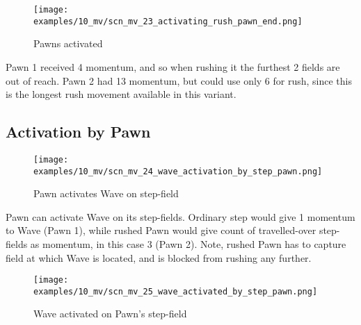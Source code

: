 \clearpage %

\noindent
\begin{figure}[!h]
\texttt{[image: examples/10\_mv/scn\_mv\_23\_activating\_rush\_pawn\_end.png]}
\caption{Pawns activated}
\label{fig:scn_mv_23_activating_rush_pawn_end}
\end{figure}

Pawn 1 received 4 momentum, and so when rushing it the furthest 2 fields are out
of reach. Pawn 2 had 13 momentum, but could use only 6 for rush, since this is the
longest rush movement available in this variant.

\clearpage %

\subsection*{Activation by Pawn}

\vspace*{-1.0ex} %
\noindent
\begin{figure}[!h]
\texttt{[image: examples/10\_mv/scn\_mv\_24\_wave\_activation\_by\_step\_pawn.png]}
\caption{Pawn activates Wave on step-field}
\label{fig:scn_mv_24_wave_activation_by_step_pawn}
\end{figure}

Pawn can activate Wave on its step-fields. Ordinary step would give 1 momentum to
Wave (Pawn 1), while rushed Pawn would give count of travelled-over step-fields as
momentum, in this case 3 (Pawn 2). Note, rushed Pawn has to capture field at which
Wave is located, and is blocked from rushing any further.

\clearpage %

\noindent
\begin{figure}[!h]
\texttt{[image: examples/10\_mv/scn\_mv\_25\_wave\_activated\_by\_step\_pawn.png]}
\caption{Wave activated on Pawn's step-field}
\label{fig:scn_mv_25_wave_activated_by_step_pawn}
\end{figure}

